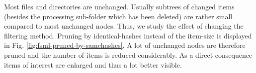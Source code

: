 Most files and directories are unchanged. Usually subtrees of changed items (besides the processing sub-folder which has been deleted) are rather small compared to most unchanged nodes. Thus, we study the effect of changing the filtering method. Pruning by identical-hashes instead of the item-size is displayed in Fig. \ref{fig:fsml-pruned-by-samehashes}. A lot of unchanged nodes are therefore pruned and the number of items is reduced considerably. As a direct consequence items of interest are enlarged and thus a lot better visible. %

